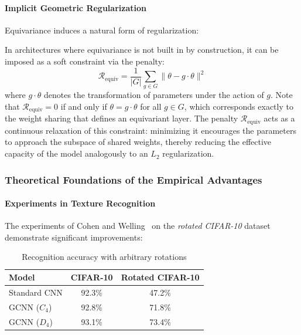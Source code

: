 \paragraph{Implicit Geometric Regularization}

Equivariance induces a natural form of regularization:

\begin{remark}\label{prop:regularizacion_equivarianza}
In architectures where equivariance is not built in by construction, it can be imposed as a soft constraint via the penalty:
\begin{equation}
\mathcal{R}_{\text{equiv}} = \frac{1}{|G|} \sum_{g \in G} \|\theta - g \cdot \theta\|^2
\end{equation}
where $g \cdot \theta$ denotes the transformation of parameters under the action of $g$. Note that $\mathcal{R}_{\text{equiv}} = 0$ if and only if $\theta = g \cdot \theta$ for all $g \in G$, which corresponds exactly to the weight sharing that defines an equivariant layer. The penalty $\mathcal{R}_{\text{equiv}}$ acts as a continuous relaxation of this constraint: minimizing it encourages the parameters to approach the subspace of shared weights, thereby reducing the effective capacity of the model analogously to an $L_2$ regularization.
\end{remark}

\subsubsection{Theoretical Foundations of the Empirical Advantages}

\paragraph{Experiments in Texture Recognition}

The experiments of Cohen and Welling~\citep{cohen2016groupequivariantconvolutional} on the \textit{rotated CIFAR-10} dataset demonstrate significant improvements:

\begin{table}[h]
\centering
\begin{tabular}{|l|c|c|}
\hline
\textbf{Model} & \textbf{CIFAR-10} & \textbf{Rotated CIFAR-10} \\
\hline
Standard CNN & 92.3\% & 47.2\% \\
\gls{GCNN} ($C_4$) & 92.8\% & 71.8\% \\
\gls{GCNN} ($D_4$) & 93.1\% & 73.4\% \\
\hline
\end{tabular}
\caption{Recognition accuracy with arbitrary rotations}
\label{tab:resultados_rotaciones}
\end{table}

